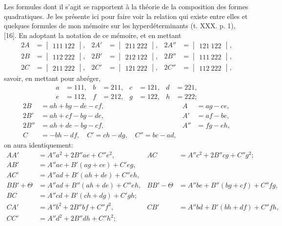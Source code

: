\documentclass[12pt,a4paper]{article}
\theoremstyle{definition}
\begin{document}
Les formules dont il s'agit se rapportent \`{a} la th\'{e}orie de la composition des formes quadratiques. Je les pr\'{e}sente ici pour faire voir la relation qui existe entre elles et quelques formules de mon m\'{e}moire sur les hyperd\'{e}terminants (t. XXX. p. 1), [16]. En adoptant la notation de ce m\'{e}moire, et en mettant
\begin{align*}
2A &= \begin{vmatrix} 111 \ 122 \end{vmatrix}, & 2A' &= \begin{vmatrix} 211 \ 222 \end{vmatrix}, & 2A'' &= \begin{vmatrix} 121 \ 122 \end{vmatrix}, \\
2B &= \begin{vmatrix} 112 \ 222 \end{vmatrix}, & 2B' &= \begin{vmatrix} 212 \ 122 \end{vmatrix}, & 2B'' &= \begin{vmatrix} 111 \ 222 \end{vmatrix}, \\
2C &= \begin{vmatrix} 211 \ 222 \end{vmatrix}, & 2C' &= \begin{vmatrix} 121 \ 222 \end{vmatrix}, & 2C'' &= \begin{vmatrix} 112 \ 222 \end{vmatrix},
\end{align*}
savoir, en mettant pour abr\'{e}ger,
\begin{align*}
a &= 111, & b &= 211, & c &= 121, & d &= 221, \\
e &= 112, & f &= 212, & g &= 122, & h &= 222;
\end{align*}
\begin{align*}
2B &= ah + bg - de - cf, & A &= ag - ce, \\
2B' &= ah + cf - bg - de, & A' &= af - be, \\
2B'' &= ah + de - bg - cf, & A'' &= fg - eh, \\
C &= -bh - df, \quad C' = ch - dg, \quad C'' = bc - ad,
\end{align*}
on aura identiquement:
\begin{align}
\tag{1} AA' &= A''a^2 + 2B''ae + C''e^2, & AC &= A''c^2 + 2B''cg + C''g^2; \\
\tag{2} AB' &= A''ac + B'(ag + ce) + C'eg, & & \\
\tag{3} AC' &= A''ad + B'(ah + de) + C''eh, & & \\
\tag{4} BB' + \Theta &= A''ad + B''(ah + de) + C''eh, & BB' - \Theta &= A''be + B''(bg + cf) + C''fg, \\
\tag{5} BC &= A''cd + B'(ch + dg) + C'gh; & & \\
\tag{6} CA' &= A''b^2 + 2B''bf + C''f^2, & CB' &= A''bd + B'(bh + df) + C''fh, \\
\tag{7} CC' &= A''d^2 + 2B''dh + C''h^2; & &
\end{align}
\end{document}
